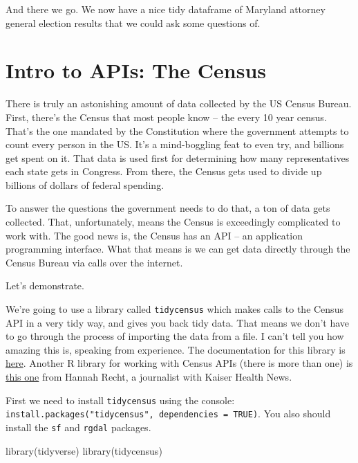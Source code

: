 \documentclass[
  letterpaper,
  DIV=11,
  numbers=noendperiod]{scrreprt}
\newenvironment{Shaded}{\begin{snugshade}}{\end{snugshade}}
\newcommand{\FunctionTok}[1]{\textcolor[rgb]{0.28,0.35,0.67}{#1}}
\newcommand{\NormalTok}[1]{\textcolor[rgb]{0.00,0.23,0.31}{#1}}
\begin{document}
And there we go. We now have a nice tidy dataframe of Maryland attorney
general election results that we could ask some questions of.


\hypertarget{intro-to-apis-the-census}{%
\chapter{Intro to APIs: The Census}\label{intro-to-apis-the-census}}

There is truly an astonishing amount of data collected by the US Census
Bureau. First, there's the Census that most people know -- the every 10
year census. That's the one mandated by the Constitution where the
government attempts to count every person in the US. It's a
mind-boggling feat to even try, and billions get spent on it. That data
is used first for determining how many representatives each state gets
in Congress. From there, the Census gets used to divide up billions of
dollars of federal spending.

To answer the questions the government needs to do that, a ton of data
gets collected. That, unfortunately, means the Census is exceedingly
complicated to work with. The good news is, the Census has an API -- an
application programming interface. What that means is we can get data
directly through the Census Bureau via calls over the internet.

Let's demonstrate.

We're going to use a library called \texttt{tidycensus} which makes
calls to the Census API in a very tidy way, and gives you back tidy
data. That means we don't have to go through the process of importing
the data from a file. I can't tell you how amazing this is, speaking
from experience. The documentation for this library is
\href{https://walker-data.com/tidycensus/}{here}. Another R library for
working with Census APIs (there is more than one) is
\href{https://github.com/hrecht/censusapi}{this one} from Hannah Recht,
a journalist with Kaiser Health News.

First we need to install \texttt{tidycensus} using the console:
\texttt{install.packages("tidycensus",\ dependencies\ =\ TRUE)}. You
also should install the \texttt{sf} and \texttt{rgdal} packages.

\begin{Shaded}
\begin{Highlighting}[]
\FunctionTok{library}\NormalTok{(tidyverse)}
\FunctionTok{library}\NormalTok{(tidycensus)}
\end{Highlighting}
\end{Shaded}
\end{document}

